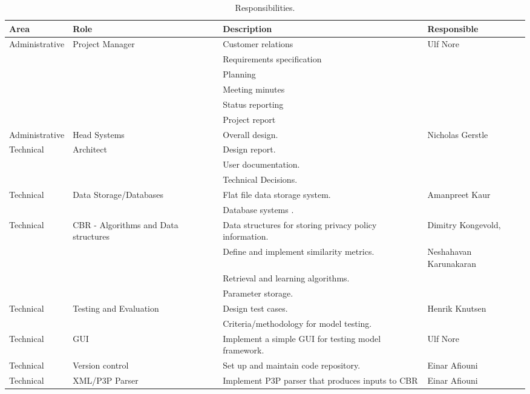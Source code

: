 \begin{table}[htdp]
\begin{center}
\begin{tabularx}{\textwidth}{| X | X | X | X |}
\hline
\textbf{Area} & \textbf{Role} & \textbf{Description} &\textbf{Responsible} \\
\hline
Administrative 		&Project Manager 	&  Customer relations & Ulf Nore \\
				&			 	& Requirements specification & \\
				&				& Planning 			      & \\
				&				& Meeting minutes 		      & \\
				&				& Status reporting		      & \\
				&				& Project report 		      & \\	
\hline
Administrative 	& Head Systems  & Overall design.	 	& Nicholas Gerstle \\
Technical 		& Architect 	   & Design report.		& \\
			&			   & User documentation.	& \\
			&			   & Technical Decisions.	& \\
\hline
\hline
Technical &	Data Storage/Databases  & Flat file data storage system. & Amanpreet Kaur \\
		&						& Database systems	.		& \\
\hline
Technical & CBR - Algorithms and Data structures 	& Data structures for storing privacy policy information.	& Dimitry Kongevold,\\
 		&								& Define and implement similarity metrics.			& Neshahavan Karunakaran \\
 		&								& Retrieval and learning algorithms. 				&	\\
		&								& Parameter storage. 							& \\
\hline
Technical 	&	Testing and Evaluation 	& Design test cases. 	& Henrik Knutsen \\
		&						& Criteria/methodology for model testing. & \\
\hline
Technical & GUI & Implement a simple GUI for testing model framework. & Ulf Nore \\
\hline
Technical & Version control & Set up and maintain code repository. & Einar Afiouni \\
\hline
Technical & XML/P3P Parser & Implement P3P parser that produces inputs to CBR & Einar Afiouni \\
\hline
\end{tabularx}
\caption{Responsibilities.}
\end{center}
\label{orgTable}
\end{table}%



